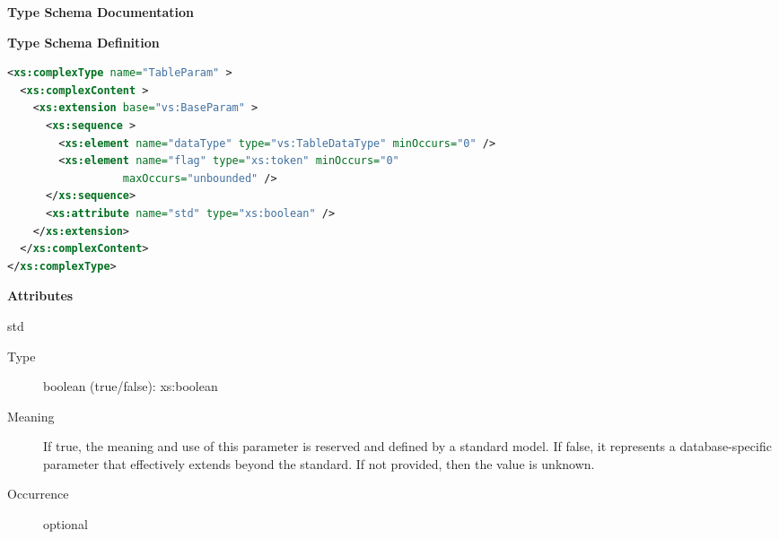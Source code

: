 \documentclass[11pt,a4paper]{ivoa}
\begin{document}
\begin{generated}
\begingroup
      	\renewcommand*\descriptionlabel[1]{%
      	\hbox to 5.5em{\emph{#1}\hfil}}\vspace{2ex}\noindent\textbf{ Type Schema Documentation}



\vspace{1ex}\noindent\textbf{ Type Schema Definition}

\begin{lstlisting}[language=XML,basicstyle=\footnotesize]
<xs:complexType name="TableParam" >
  <xs:complexContent >
    <xs:extension base="vs:BaseParam" >
      <xs:sequence >
        <xs:element name="dataType" type="vs:TableDataType" minOccurs="0" />
        <xs:element name="flag" type="xs:token" minOccurs="0"
                  maxOccurs="unbounded" />
      </xs:sequence>
      <xs:attribute name="std" type="xs:boolean" />
    </xs:extension>
  </xs:complexContent>
</xs:complexType>
\end{lstlisting}

\vspace{0.5ex}\noindent\textbf{ Attributes}

\begingroup\small\begin{bigdescription}
\item[std]
\begin{description}
\item[Type] boolean (true/false): xs:boolean
\item[Meaning] 
                     If true, the meaning and use of this parameter is
                     reserved and defined by a standard model.  If false, 
                     it represents a database-specific parameter 
                     that effectively extends beyond the standard.  If
                     not provided, then the value is unknown.
                  
\item[Occurrence] optional
\end{description}


\end{bigdescription}\endgroup




\end{generated}
\end{document}
